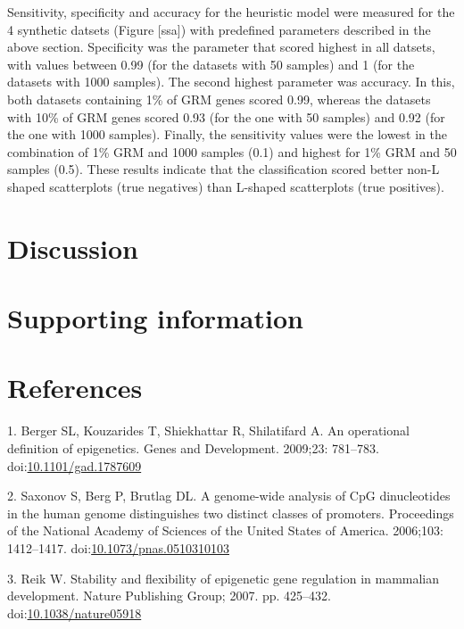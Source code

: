 \documentclass[10pt,letterpaper]{article}
\begin{document}
Sensitivity, specificity and accuracy for the heuristic model were
measured for the 4 synthetic datsets (Figure {[}ssa{]}) with predefined
parameters described in the above section. Specificity was the parameter
that scored highest in all datsets, with values between 0.99 (for the
datasets with 50 samples) and 1 (for the datasets with 1000 samples).
The second highest parameter was accuracy. In this, both datasets
containing 1\% of GRM genes scored 0.99, whereas the datasets with 10\%
of GRM genes scored 0.93 (for the one with 50 samples) and 0.92 (for the
one with 1000 samples). Finally, the sensitivity values were the lowest
in the combination of 1\% GRM and 1000 samples (0.1) and highest for 1\%
GRM and 50 samples (0.5). These results indicate that the classification
scored better non-L shaped scatterplots (true negatives) than L-shaped
scatterplots (true positives).

\hypertarget{discussion}{%
\section{Discussion}\label{discussion}}

\hypertarget{supporting-information}{%
\section{Supporting information}\label{supporting-information}}

\hypertarget{references}{%
\section*{References}\label{references}}

\hypertarget{refs}{}
\leavevmode\hypertarget{ref-Berger2009}{}%
1. Berger SL, Kouzarides T, Shiekhattar R, Shilatifard A. An operational
definition of epigenetics. Genes and Development. 2009;23: 781--783.
doi:\href{https://doi.org/10.1101/gad.1787609}{10.1101/gad.1787609}

\leavevmode\hypertarget{ref-Saxonov2006}{}%
2. Saxonov S, Berg P, Brutlag DL. A genome-wide analysis of CpG
dinucleotides in the human genome distinguishes two distinct classes of
promoters. Proceedings of the National Academy of Sciences of the United
States of America. 2006;103: 1412--1417.
doi:\href{https://doi.org/10.1073/pnas.0510310103}{10.1073/pnas.0510310103}

\leavevmode\hypertarget{ref-Reik2007}{}%
3. Reik W. Stability and flexibility of epigenetic gene regulation in
mammalian development. Nature Publishing Group; 2007. pp. 425--432.
doi:\href{https://doi.org/10.1038/nature05918}{10.1038/nature05918}
\end{document}
